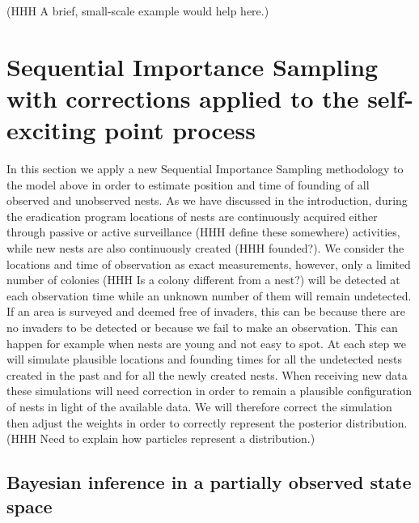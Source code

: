 \documentclass{article}
\begin{document}
(HHH A brief, small-scale example would help here.)






\section{Sequential Importance Sampling with corrections applied to the self-exciting point process} \label{sec:SISMethod}

In this section we apply a new Sequential Importance Sampling methodology to the model above in order to estimate position and time of founding of all observed and unobserved nests. As we have discussed in the introduction, during the eradication program locations of nests are continuously acquired either through passive or active surveillance (HHH define these somewhere) activities, while new nests are also continuously created (HHH founded?). We consider the locations and time of observation as exact measurements, however, only a limited number of colonies (HHH Is a colony different from a nest?) will be detected at each observation time while an unknown number of them will remain undetected. If an area is surveyed and deemed free of invaders, this can be because there are no invaders to be detected or because we fail to make an observation. This can happen for example when nests are young and not easy to spot. At each step we will simulate plausible locations and founding times for all the undetected nests created in the past and for all the newly created nests. When receiving new data these simulations will need correction in order to remain a plausible configuration of nests in light of the available data. We will therefore correct the simulation then adjust the weights in order to correctly represent the posterior distribution. (HHH Need to explain how particles represent a distribution.)

\subsection{Bayesian inference in a partially observed state space} \label{subsec:POS}
\end{document}
